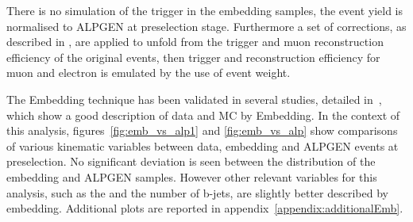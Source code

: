 

There is no simulation of the trigger in the embedding samples, the event yield
is normalised to ALPGEN \Ztautau at preselection stage. Furthermore a set of corrections, as described in \cite{SMnew}, are
applied to unfold from the trigger and muon reconstruction efficiency of 
the original \Zmumu events, then trigger and reconstruction efficiency for muon and electron is emulated 
by the use of event weight.

The Embedding technique has been validated in several studies, detailed in~\cite{Embedding, SMnew}, which show a good description of 
data and \Ztautau MC by Embedding. In the context of this analysis, 
figures~\ref{fig:emb_vs_alp1} and \ref{fig:emb_vs_alp} show comparisons of various kinematic variables between
data, embedding and ALPGEN \Ztautau events at preselection. No significant deviation is seen 
between the \mmc distribution of the embedding and ALPGEN samples. 
However other relevant variables for this analysis, such as the \MET 
and the number of b-jets, are slightly better described by embedding. Additional plots are 
reported in appendix~\ref{appendix:additionalEmb}.


